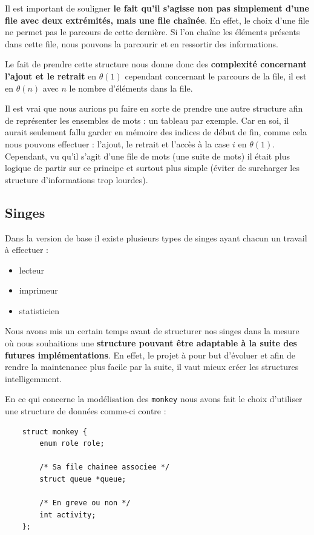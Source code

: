\documentclass{article}
\newcommand{\inlinecode}[2]{\colorbox{white}{\lstinline[language=#1]$#2$}}
\begin{document}
Il est important de souligner \textbf{le fait qu'il s'agisse non pas simplement d'une file avec deux extrémités, mais une file chaînée}. En effet, le choix d'une file ne permet pas le parcours de cette dernière. Si l'on chaîne les éléments présents dans cette file, nous pouvons la parcourir et en ressortir des informations.

Le fait de prendre cette structure nous donne donc des \textbf{complexité concernant l'ajout et le retrait} en $\theta(1)$ cependant concernant le parcours de la file, il est en $\theta(n)$ avec $n$ le nombre d'éléments dans la file.

Il est vrai que nous aurions pu faire en sorte de prendre une autre structure afin de représenter les ensembles de mots : un tableau par exemple. Car en soi, il aurait seulement fallu garder en mémoire des indices de début de fin, comme cela nous pouvons effectuer : l'ajout, le retrait et l'accès à la case $i$ en $\theta(1)$. Cependant, vu qu'il s'agit d'une file de mots (une suite de mots) il était plus logique de partir sur ce principe et surtout plus simple (éviter de surcharger les structure d'informations trop lourdes).


\subsection{Singes}
\label{subsct:singes}

Dans la version de base il existe plusieurs types de singes ayant chacun un travail à effectuer :

\begin{itemize}
    \item lecteur
    \item imprimeur
    \item statisticien
\end{itemize}

Nous avons mis un certain temps avant de structurer nos singes dans la mesure où nous souhaitions une \textbf{structure pouvant être adaptable à la suite des futures implémentations}.
En effet, le projet à pour but d'évoluer et afin de rendre la maintenance plus facile par la suite, il vaut mieux créer les structures intelligemment.

En ce qui concerne la modélisation des \inlinecode{C}{monkey} nous avons fait le choix d'utiliser une structure de données comme-ci contre :
\begin{lstlisting}
    struct monkey {
        enum role role;
        
        /* Sa file chainee associee */
        struct queue *queue;
        
        /* En greve ou non */
        int activity;     
    }; 
\end{lstlisting}
\label{lst:singes_conteneur}
\end{document}
